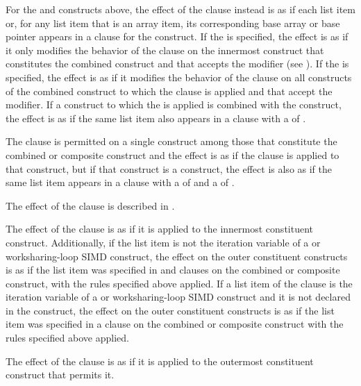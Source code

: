 For the  and  constructs above, the effect of the
 clause instead is as if each list item or, for any list item 
that is an array item, its corresponding base array or base pointer appears 
in a  clause for the construct. If the  
 is specified, the effect is as if it only modifies 
the behavior of the  clause on the innermost construct that 
constitutes the combined construct and that accepts the modifier (see 
). If the   
is specified, the effect is as if it modifies the behavior of the  
clause on all constructs  of the combined construct to which the clause is applied 
and that accept the modifier. If a construct to which the  
 is applied is combined with the  construct, 
the effect is as if the same list item also appears in a  clause with a 
 of .

The  clause is permitted on a single construct among those that
constitute the combined or composite construct and the effect is as if the clause 
is applied to that construct, but if that construct is a  construct, 
the effect is also as if the same list item appears in a  clause with a 
 of  and a  of .

The effect of the  clause is described in .
 
The effect of the  clause is as if it is applied to the innermost
constituent construct. Additionally, if the list item is not the iteration 
variable of a  or worksharing-loop SIMD construct, the effect on 
the outer constituent constructs is as if the list item was specified in 
 and  clauses on the combined or composite 
construct, with the rules specified above applied. If a list item of the 
 clause is the iteration variable of a  or worksharing-loop 
SIMD construct and it is not declared in the construct, the effect on the outer 
constituent constructs is as if the list item was specified in a  
clause on the combined or composite construct with the rules specified above applied.

The effect of the  clause is as if it is applied to the outermost 
constituent construct that permits it.

